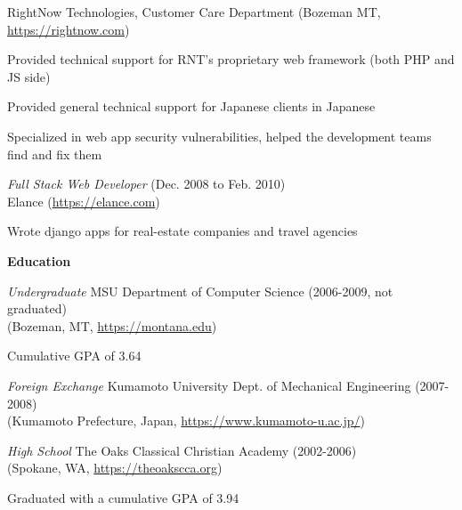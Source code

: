 \documentclass[10pt, a4paper]{article}
\begin{document}
\begin{itemize*}
    RightNow Technologies, Customer Care Department (Bozeman MT, \url{https://rightnow.com})
    \begin{itemize*}
      \item Provided technical support for RNT's proprietary web framework (both PHP and JS side)
      \item Provided general technical support for Japanese clients in Japanese
      \item Specialized in web app security vulnerabilities, helped the development teams find and fix them
    \end{itemize*}
  \item \emph{Full Stack Web Developer} (Dec. 2008 to Feb. 2010)\\
    Elance (\url{https://elance.com})
    \begin{itemize*}
      \item Wrote django apps for real-estate companies and travel agencies
    \end{itemize*}
\end{itemize*}
\textbf{Education}
\begin{itemize*}
  \item \emph{Undergraduate} MSU Department of Computer Science (2006-2009, not graduated)\\
    (Bozeman, MT, \url{https://montana.edu})
    \begin{itemize*}
      \item Cumulative GPA of 3.64
    \end{itemize*}
  \item \emph{Foreign Exchange} Kumamoto University Dept. of Mechanical Engineering (2007-2008)\\
    (Kumamoto Prefecture, Japan, \url{https://www.kumamoto-u.ac.jp/})
  \item \emph{High School} The Oaks Classical Christian Academy (2002-2006)\\
    (Spokane, WA, \url{https://theoakscca.org})
    \begin{itemize*}
      \item Graduated with a cumulative GPA of 3.94
    \end{itemize*}
\end{itemize*}
\end{document}

